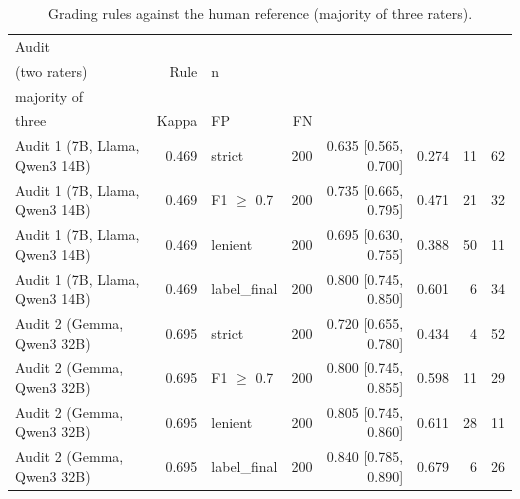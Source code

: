 \begin{table}[t]
\centering\small
\setlength{\tabcolsep}{4pt}
\caption{Grading rules against the human reference (majority of three raters).}
\label{tab:audit}
\begin{tabular*}{\linewidth}{@{\extracolsep{\fill}}lrlrrrrr}
\toprule
Audit & \begin{tabular}[b]{@{}r@{}}Rater kappa \\ (two raters)\end{tabular} & Rule & n & \begin{tabular}[b]{@{}r@{}}Accuracy vs \\ majority of \\ three\end{tabular} & Kappa & FP & FN \\
\midrule
Audit 1 (7B, Llama, Qwen3 14B) & 0.469 & strict & 200 & 0.635 [0.565, 0.700] & 0.274 & 11 & 62 \\
Audit 1 (7B, Llama, Qwen3 14B) & 0.469 & F1 $\geq$ 0.7 & 200 & 0.735 [0.665, 0.795] & 0.471 & 21 & 32 \\
Audit 1 (7B, Llama, Qwen3 14B) & 0.469 & lenient & 200 & 0.695 [0.630, 0.755] & 0.388 & 50 & 11 \\
Audit 1 (7B, Llama, Qwen3 14B) & 0.469 & label\_final & 200 & 0.800 [0.745, 0.850] & 0.601 & 6 & 34 \\
Audit 2 (Gemma, Qwen3 32B) & 0.695 & strict & 200 & 0.720 [0.655, 0.780] & 0.434 & 4 & 52 \\
Audit 2 (Gemma, Qwen3 32B) & 0.695 & F1 $\geq$ 0.7 & 200 & 0.800 [0.745, 0.855] & 0.598 & 11 & 29 \\
Audit 2 (Gemma, Qwen3 32B) & 0.695 & lenient & 200 & 0.805 [0.745, 0.860] & 0.611 & 28 & 11 \\
Audit 2 (Gemma, Qwen3 32B) & 0.695 & label\_final & 200 & 0.840 [0.785, 0.890] & 0.679 & 6 & 26 \\
\bottomrule
\end{tabular*}
\end{table}
